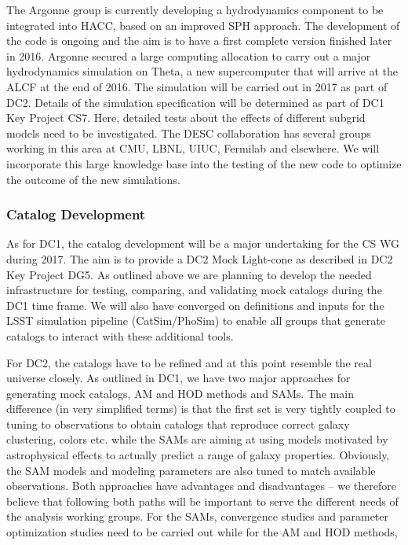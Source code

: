 The Argonne group is currently developing a hydrodynamics component to be integrated into HACC, based on an improved SPH approach. The development of the code is ongoing and the aim is to have a first complete version finished later in 2016. Argonne secured a large computing allocation to carry out a major hydrodynamics simulation on Theta, a new supercomputer that will arrive at the ALCF at the end of 2016. The simulation will be carried out in 2017 as part of DC2. Details of the simulation specification will be determined as part of DC1 Key Project CS7. Here, detailed tests about the effects of different subgrid models need to be investigated. The DESC collaboration has several groups working in this area at CMU, LBNL, UIUC, Fermilab and elsewhere. We will incorporate this large knowledge base into the testing of the new code to optimize the outcome of the new simulations.



\subsubsection{Catalog Development}
\label{sec:keysims:dc2:dev}

As for DC1, the catalog development will be a major undertaking for the CS WG during 2017. The aim is to provide a DC2 Mock Light-cone as described in DC2 Key Project DG5. As outlined above we are planning to develop the needed infrastructure for testing, comparing, and validating mock catalogs during the DC1 time frame. We will also have converged on definitions and inputs for the LSST simulation pipeline (CatSim/PhoSim) to enable all groups that generate catalogs to interact with these additional tools. 

For DC2, the catalogs have to be refined and at this point resemble the real universe closely. As outlined in DC1, we have two major approaches for generating mock catalogs, AM and HOD methods and SAMs. The main difference (in very simplified terms) is that the first set is very tightly coupled to tuning to observations to obtain catalogs that reproduce correct galaxy clustering, colors etc. while the SAMs are aiming at using models motivated by astrophysical effects to actually predict a range of galaxy properties. Obviously, the SAM models and modeling parameters are also tuned to match available observations. Both approaches have advantages and disadvantages -- we therefore believe that following both paths will be important to serve the different needs of the analysis working groups. For the SAMs, convergence studies and parameter optimization studies need to be carried out while for the AM and HOD methods, 

